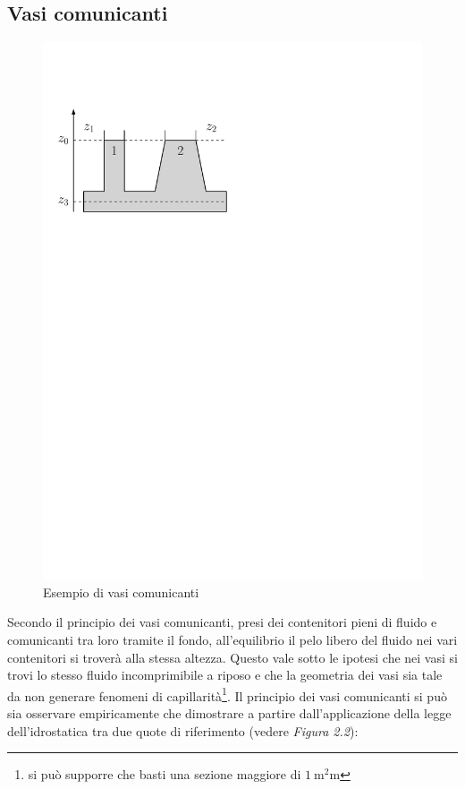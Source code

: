 \subsection{Vasi comunicanti}
%
	\begin{figure}[ht]
		\includegraphics[scale=0.7]{./2.2 Legge dell'idrostatica/2.2-1}
		\centering
		\caption{Esempio di vasi comunicanti}
	\end{figure}
%
Secondo il principio dei vasi comunicanti, presi dei contenitori pieni di fluido e comunicanti tra loro tramite il fondo, all'equilibrio il pelo libero del fluido nei vari contenitori si troverà alla stessa altezza.
Questo vale sotto le ipotesi che nei vasi si trovi lo stesso fluido incomprimibile a riposo e che la geometria dei vasi sia tale da non generare fenomeni di capillarità\footnote{si può supporre che basti una sezione maggiore di $\SI{1}{\square \milli \metre}$}.
Il principio dei vasi comunicanti si può sia osservare empiricamente che dimostrare a partire dall'applicazione della legge dell'idrostatica tra due quote di riferimento (vedere \textit{Figura 2.2}):
